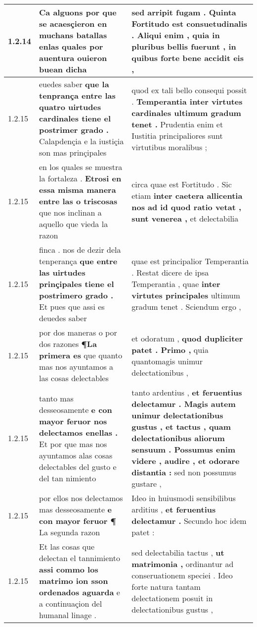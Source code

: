 \begin{tabular}{|p{1cm}|p{6.5cm}|p{6.5cm}|}
1.2.14 & Ca alguons \textbf{ por que se acaesçieron en muchans batallas } enlas quales por auentura ouieron buean dicha & sed arripit fugam . Quinta Fortitudo est consuetudinalis . Aliqui enim , \textbf{ quia in pluribus bellis fuerunt , } in quibus forte bene accidit eis , \\\hline
1.2.15 & euedes saber \textbf{ que la tenprança entre las quatro uirtudes cardinales tiene el postrimer grado . } Calapdençia e la iustiçia son mas prinçipales & quod ex tali bello consequi possit . \textbf{ Temperantia inter virtutes cardinales ultimum gradum tenet . } Prudentia enim et Iustitia principaliores sunt virtutibus moralibus ; \\\hline
1.2.15 & en los quales se muestra la fortaleza . \textbf{ Etrosi en essa misma manera entre las o triscosas } que nos inclinan a aquello que vieda la razon & circa quae est Fortitudo . Sic etiam \textbf{ inter caetera allicentia nos ad id quod ratio vetat , sunt venerea , } et delectabilia \\\hline
1.2.15 & finca . nos de dezir dela tenperança \textbf{ que entre las uirtudes prinçipales tiene el postrimero grado . } Et pues que assi es deuedes saber & quae est principalior Temperantia . Restat dicere de ipsa Temperantia , quae \textbf{ inter virtutes principales } ultimum gradum tenet . Sciendum ergo , \\\hline
1.2.15 & por dos maneras o por dos razones \textbf{ ¶La primera es } que quanto mas nos ayuntamos a las cosas delectables & et odoratum , \textbf{ quod dupliciter patet . Primo , } quia quantomagis unimur delectationibus , \\\hline
1.2.15 & tanto mas desseosamente \textbf{ e con mayor feruor nos delectamos enellas . } Et por que mas nos ayuntamos alas cosas delectables del gusto e del tan nimiento & tanto ardentius , \textbf{ et feruentius delectamur . Magis autem unimur delectationibus gustus , et tactus , quam delectationibus aliorum sensuum . Possumus enim videre , audire , et odorare distantia : } sed non possumus gustare , \\\hline
1.2.15 & por ellos nos delectamos mas desseosamente \textbf{ e con mayor feruor ¶ } La segunda razon & Ideo in huiusmodi sensibilibus arditius , \textbf{ et feruentius delectamur . } Secundo hoc idem patet : \\\hline
1.2.15 & Et las cosas que delectan el tannimiento \textbf{ assi commo los matrimo ion sson ordenados aguarda } e a continuaçion del humanal linage . & sed delectabilia tactus , \textbf{ ut matrimonia , } ordinantur ad conseruationem speciei . Ideo forte natura tantam delectationem posuit in delectationibus gustus , \\\hline

\end{tabular}
